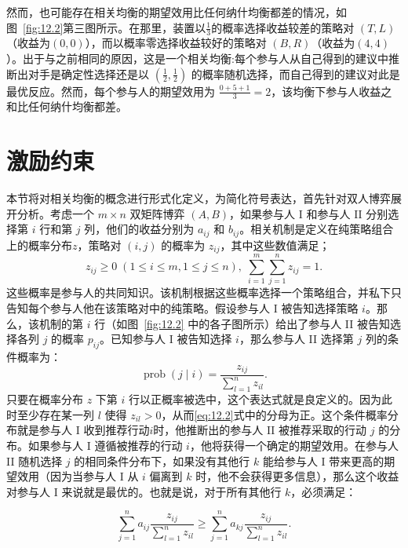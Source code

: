 然而，也可能存在相关均衡的期望效用比任何纳什均衡都差的情况，如图~\ref{fig:12.2}第三图所示。在那里，装置以\(\frac{1}{3}\)的概率选择收益较差的策略对 $(T,L)$（收益为$(0,0)$），而以概率零选择收益较好的策略对 $(B,R)$（收益为$(4,4)$）。出于与之前相同的原因，这是一个相关均衡:每个参与人从自己得到的建议中推断出对手是确定性选择还是以 \(\left( {\frac{1}{2},\frac{1}{2}}\right)\) 的概率随机选择，而自己得到的建议对此是最优反应。然而，每个参与人的期望效用为 \(\frac{0 + 5 + 1}{3} = 2\)，该均衡下参与人收益之和比任何纳什均衡都差。

\section{激励约束}\label{sec12.3}

本节将对相关均衡的概念进行形式化定义，为简化符号表达，首先针对双人博弈展开分析。考虑一个 \(m\times n\) 双矩阵博弈 \((A,B)\)，如果参与人 I 和参与人 II 分别选择第 \(i\) 行和第 \(j\) 列，他们的收益分别为 \(a_{ij}\) 和 \(b_{ij}\)。相关机制是定义在纯策略组合上的概率分布\(z\)，策略对 \((i,j)\) 的概率为 \(z_{ij}\)，其中这些数值满足；
\begin{equation}
{z}_{ij} \geq  0\;\left( {1 \leq  i \leq  m,1 \leq  j \leq  n}\right) ,\;\mathop{\sum }\limits_{{i = 1}}^{m}\mathop{\sum }\limits_{{j = 1}}^{n}{z}_{ij} = 1. \label{eq:12.1}
\end{equation}
这些概率是参与人的共同知识。该机制根据这些概率选择一个策略组合，并私下只告知每个参与人他在该策略对中的纯策略。假设参与人 I 被告知选择策略 \(i\)。那么，该机制的第 \(i\) 行（如图~\ref{fig:12.2} 中的各子图所示）给出了参与人 II 被告知选择各列 \(j\) 的概率 \(p_{ij}\)。已知参与人 I 被告知选择 \(i\)，那么参与人 II 选择第 \(j\) 列的条件概率为：
\begin{equation}
\operatorname{prob}\left( {j \mid  i}\right)  = \frac{{z}_{ij}}{\mathop{\sum }\limits_{{l = 1}}^{n}{z}_{il}}. \label{eq:12.2}
\end{equation}
只要在概率分布 $z$ 下第 $i$ 行以正概率被选中，这个表达式就是良定义的。因为此时至少存在某一列 \(l\) 使得 \(z_{il}>0\)，从而\eqref{eq:12.2}式中的分母为正。这个条件概率分布就是参与人 I 收到推荐行动\(i\)时，他推断出的参与人 II 被推荐采取的行动 \(j\) 的分布。如果参与人 I 遵循被推荐的行动 \(i\)，他将获得一个确定的期望效用。在参与人 II 随机选择 \(j\) 的相同条件分布下，如果没有其他行 \(k\) 能给参与人 I 带来更高的期望效用（因为当参与人 I 从 \(i\) 偏离到 \(k\) 时，他不会获得更多信息），那么这个收益对参与人 I 来说就是最优的。也就是说，对于所有其他行 \(k\)，必须满足：

\begin{equation}
\mathop{\sum }\limits_{{j = 1}}^{n}{a}_{ij}\frac{{z}_{ij}}{\mathop{\sum }\limits_{{l = 1}}^{n}{z}_{il}} \geq  \mathop{\sum }\limits_{{j = 1}}^{n}{a}_{kj}\frac{{z}_{ij}}{\mathop{\sum }\limits_{{l = 1}}^{n}{z}_{il}}. \label{eq:12.3}
\end{equation}


